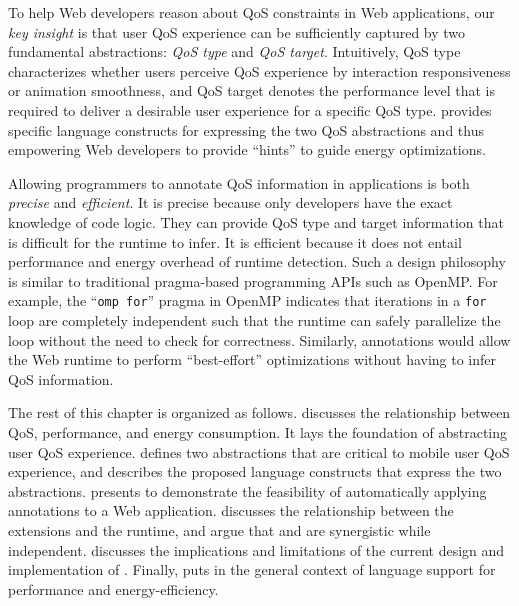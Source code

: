 To help Web developers reason about QoS constraints in Web applications, our \textit{key insight} is that user QoS experience can be sufficiently captured by two fundamental abstractions: \textit{QoS type} and \textit{QoS target}. Intuitively, QoS type characterizes whether users perceive QoS experience by interaction responsiveness or animation smoothness, and QoS target denotes the performance level that is required to deliver a desirable user experience for a specific QoS type. \greenweb provides specific language constructs for expressing the two QoS abstractions and thus empowering Web developers to provide ``hints'' to guide energy optimizations.

Allowing programmers to annotate QoS information in applications is both \textit{precise} and \textit{efficient}. It is precise because only developers have the exact knowledge of code logic. They can provide QoS type and target information that is difficult for the runtime to infer. It is efficient because it does not entail performance and energy overhead of runtime detection. Such a design philosophy is similar to traditional pragma-based programming APIs such as OpenMP. For example, the ``\texttt{omp for}'' pragma in OpenMP indicates that iterations in a \texttt{for} loop are completely independent such that the runtime can safely parallelize the loop without the need to check for correctness. Similarly, \greenweb annotations would allow the Web runtime to perform ``best-effort'' optimizations without having to infer QoS information.

The rest of this chapter is organized as follows.  discusses the relationship between QoS, performance, and energy consumption. It lays the foundation of abstracting user QoS experience.  defines two abstractions that are critical to mobile user QoS experience, and  describes the proposed \greenweb language constructs that express the two abstractions.  presents \autogreen to demonstrate the feasibility of automatically applying \greenweb annotations to a Web application.  discusses the relationship between the \greenweb extensions and the \webrt runtime, and argue that \greenweb and \webrt are synergistic while independent.  discusses the implications and limitations of the current design and implementation of \greenweb. Finally,  puts \greenweb in the general context of language support for performance and energy-efficiency.

